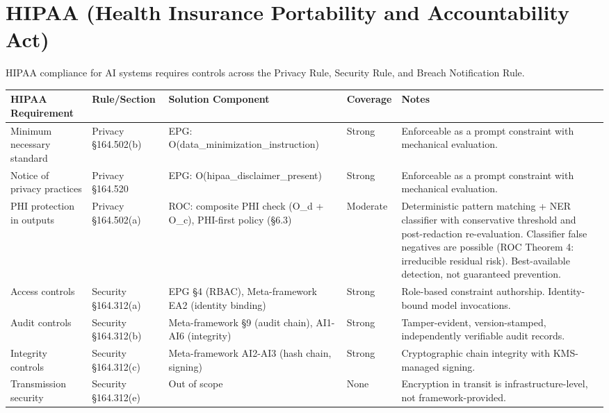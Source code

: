 \section{HIPAA (Health Insurance Portability and Accountability Act)}
\label{sec:regmap-4}


HIPAA compliance for AI systems requires controls across the Privacy Rule, Security Rule, and Breach Notification Rule.

\begin{table}[ht]
  \centering\footnotesize
  \begin{tabular}{@{}>{\raggedright\arraybackslash}p{1.05cm}>{\raggedright\arraybackslash}p{1.05cm}>{\raggedright\arraybackslash}p{2.25cm}>{\raggedright\arraybackslash}p{1.05cm}>{\raggedright\arraybackslash}p{8.26cm}@{}}
  \toprule
  HIPAA Requirement & Rule/Section & Solution Component & Coverage & Notes \\
  \midrule
  Minimum necessary standard & Privacy \S{}164.502(b) & EPG: O(data\_\allowbreak{}minimization\_\allowbreak{}instruction) & Strong & Enforceable as a prompt constraint with mechanical evaluation. \\
  Notice of privacy practices & Privacy \S{}164.520 & EPG: O(hipaa\_\allowbreak{}disclaimer\_\allowbreak{}present) & Strong & Enforceable as a prompt constraint with mechanical evaluation. \\
  PHI protection in outputs & Privacy \S{}164.502(a) & ROC: composite PHI check (O\_\allowbreak{}d + O\_\allowbreak{}c), PHI-first policy (\S{}6.3) & Moderate & Deterministic pattern matching + NER classifier with conservative threshold and post-redaction re-evaluation. Classifier false negatives are possible (ROC Theorem 4: irreducible residual risk). Best-available detection, not guaranteed prevention. \\
  Access controls & Security \S{}164.312(a) & EPG \S{}4 (RBAC), Meta-framework EA2 (identity binding) & Strong & Role-based constraint authorship. Identity-bound model invocations. \\
  Audit controls & Security \S{}164.312(b) & Meta-framework \S{}9 (audit chain), AI1-AI6 (integrity) & Strong & Tamper-evident, version-stamped, independently verifiable audit records. \\
  Integrity controls & Security \S{}164.312(c) & Meta-framework AI2-AI3 (hash chain, signing) & Strong & Cryptographic chain integrity with KMS-managed signing. \\
  Transmission security & Security \S{}164.312(e) & Out of scope & None & Encryption in transit is infrastructure-level, not framework-provided. \\

\end{tabular}
\end{table}

